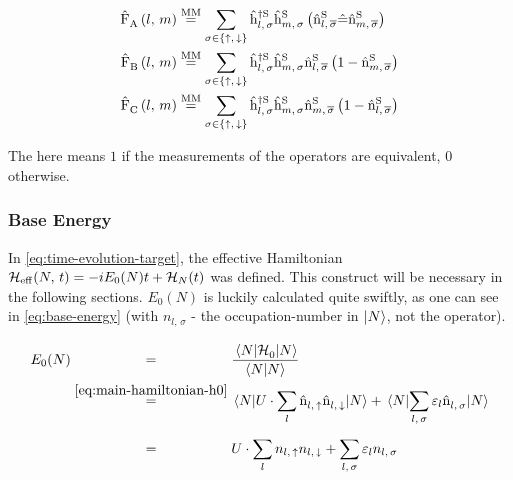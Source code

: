 \begin{equation}
    \label{eq:interaction-picture-v-ham-parts-simplified}
    \begin{split}
        \VhamiltonianOperatorPart{A}{l}{m} &\stackrel{\text{MM}}{=} 
        \lsum[\sigma \in \left\{\up,\,\down\right\}]
        \withspinhcop[\schroedingerPicture]{l}{\sigma}{\dagger}\withspinhcop[\schroedingerPicture]{m}{\sigma}{}
        \left(\nop[\schroedingerPicture]{l}{\overline{\sigma}}
            \equivalentOperator 
            \nop[\schroedingerPicture]{m}{\overline{\sigma}}
        \right)
        \\
        \VhamiltonianOperatorPart{B}{l}{m} &\stackrel{\text{MM}}{=} 
        \lsum[\sigma \in \left\{\up,\,\down\right\}]        
        \withspinhcop[\schroedingerPicture]{l}{\sigma}{\dagger}\withspinhcop[\schroedingerPicture]{m}{\sigma}{}
        \nop[\schroedingerPicture]{l}{\overline{\sigma}}
        \left(
            1 - \nop[\schroedingerPicture]{m}{\overline{\sigma}}
        \right)
        \\
        \VhamiltonianOperatorPart{C}{l}{m} &\stackrel{\text{MM}}{=} 
        \lsum[\sigma \in \left\{\up,\,\down\right\}]
        \withspinhcop[\schroedingerPicture]{l}{\sigma}{\dagger}\withspinhcop[\schroedingerPicture]{m}{\sigma}{}
        \nop[\schroedingerPicture]{m}{\overline{\sigma}}
        \left(
           1 - \nop[\schroedingerPicture]{l}{\overline{\sigma}}
        \right)
        \\
    \end{split}
\end{equation}

The \equivalentOperator here means \glqq $1$ if the measurements of the operators are equivalent, $0$ otherwise\grqq.

\subsubsection*{Base Energy}

In \autoref{eq:time-evolution-target}, the effective Hamiltonian ${\mathcal{H}_\text{eff}}^{}({N},\,t) = -i E_0(N) t + \mathcal{H}_{N}(t)$ was defined.
This construct will be necessary in the following sections. 
$E_0(N)$ is luckily calculated quite swiftly, as one can see in \autoref{eq:base-energy} (with $n_{l,\,\sigma}$ - the occupation-number in $\ket{N}$, not the operator).

\begin{equation}
    \label{eq:base-energy}
    \begin{split}
        E_0(N) &\stackrel{\phantom{\ref{eq:main-hamiltonian-h0}}}{=} \frac{\bracketHelper{N}{\HzeroHamiltonian[]}{N}}{\braketHelper{N}{N}} \\
        &\stackrel{\ref{eq:main-hamiltonian-h0}}{=} \bracketHelper{N}{U \cdot \lsum \nop{l}{\up}\nop{l}{\down}}{N} + \bracketHelper{N}{\lsum[l,\,\sigma] \epsl \nop{l}{\sigma}}{N}\\
        &\stackrel{\phantom{\ref{eq:main-hamiltonian-h0}}}{=} U \cdot \lsum n_{l,\,\up}n_{l,\,\down} + \lsum[l,\,\sigma] \epsl n_{l,\,\sigma}
    \end{split}
\end{equation}

